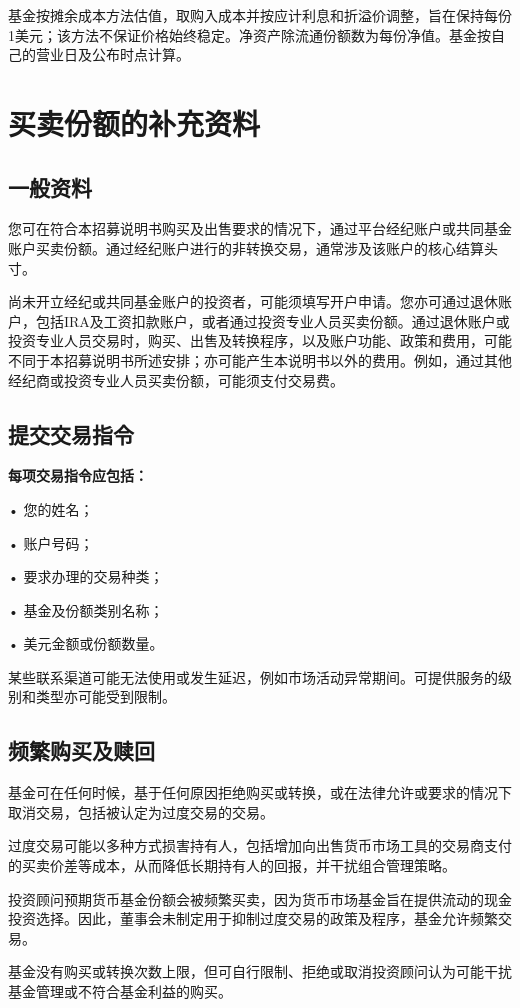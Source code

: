 \documentclass[UTF8,fontset=none,11pt,a4paper]{ctexart}
\begin{document}
基金按摊余成本方法估值，取购入成本并按应计利息和折溢价调整，旨在保持每份1美元；该方法不保证价格始终稳定。净资产除流通份额数为每份净值。基金按自己的营业日及公布时点计算。


\section*{买卖份额的补充资料}
\subsection*{一般资料}
您可在符合本招募说明书购买及出售要求的情况下，通过平台经纪账户或共同基金账户买卖份额。通过经纪账户进行的非转换交易，通常涉及该账户的核心结算头寸。


尚未开立经纪或共同基金账户的投资者，可能须填写开户申请。您亦可通过退休账户，包括IRA及工资扣款账户，或者通过投资专业人员买卖份额。通过退休账户或投资专业人员交易时，购买、出售及转换程序，以及账户功能、政策和费用，可能不同于本招募说明书所述安排；亦可能产生本说明书以外的费用。例如，通过其他经纪商或投资专业人员买卖份额，可能须支付交易费。


\subsection*{提交交易指令}
\textbf{每项交易指令应包括：}


• 您的姓名；


• 账户号码；


• 要求办理的交易种类；


• 基金及份额类别名称；


• 美元金额或份额数量。


某些联系渠道可能无法使用或发生延迟，例如市场活动异常期间。可提供服务的级别和类型亦可能受到限制。


\subsection*{频繁购买及赎回}
基金可在任何时候，基于任何原因拒绝购买或转换，或在法律允许或要求的情况下取消交易，包括被认定为过度交易的交易。


过度交易可能以多种方式损害持有人，包括增加向出售货币市场工具的交易商支付的买卖价差等成本，从而降低长期持有人的回报，并干扰组合管理策略。


投资顾问预期货币基金份额会被频繁买卖，因为货币市场基金旨在提供流动的现金投资选择。因此，董事会未制定用于抑制过度交易的政策及程序，基金允许频繁交易。


基金没有购买或转换次数上限，但可自行限制、拒绝或取消投资顾问认为可能干扰基金管理或不符合基金利益的购买。
\end{document}
